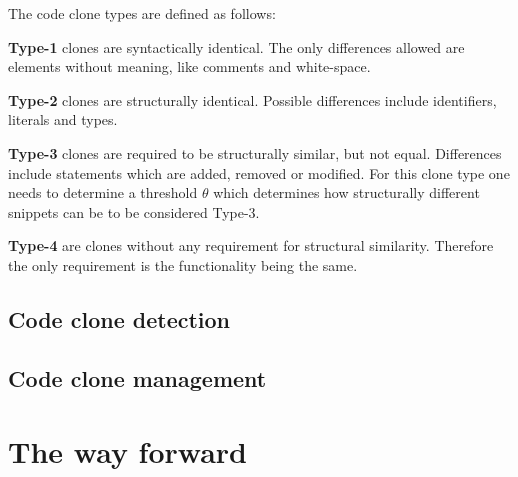 \documentclass[12pt]{article}
\begin{document}
The code clone types are defined as follows:

\textbf{Type-1} clones are syntactically identical. The only differences allowed are elements
without meaning, like comments and white-space. 

\textbf{Type-2} clones are structurally identical. Possible differences include
identifiers, literals and types. 

\textbf{Type-3} clones are required to be structurally similar, but not equal. Differences
include statements which are added, removed or modified. For this clone type one needs to
determine a threshold $\theta$ which determines how structurally different snippets can be
to be considered Type-3\cite{Inoue_introduction_to_cc}.

\textbf{Type-4} are clones without any requirement for structural similarity. Therefore
the only requirement is the functionality being the same.

\subsection{Code clone detection}

\subsection{Code clone management}

\section{The way forward}



\end{document}
